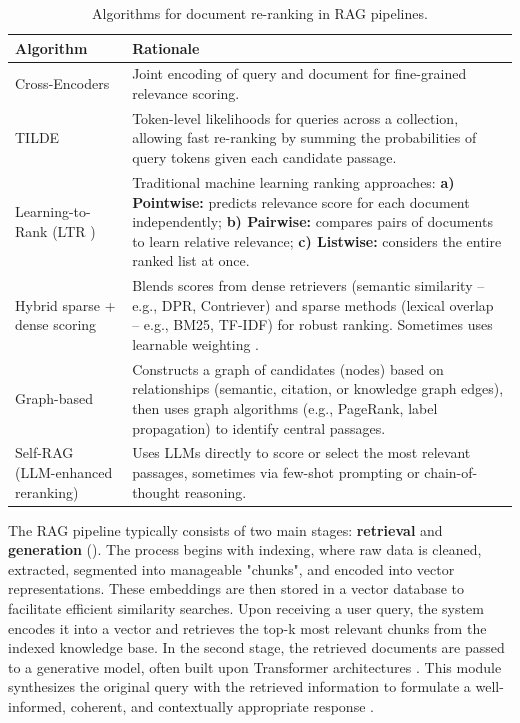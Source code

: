 \begin{spacing}{1.5}
\begin{table}[H]
\centering
\footnotesize
\begin{tabularx}{\textwidth}{l X}
\toprule
\textbf{Algorithm} & \textbf{Rationale} \\
\midrule
Cross-Encoders & Joint encoding of query and document for fine-grained relevance scoring. \\
\cmidrule(lr){1-2}
TILDE \citep{zhuang_tilde_2021} & Token-level likelihoods for queries across a collection, allowing fast re-ranking by summing the probabilities of query tokens given each candidate passage. \\
\cmidrule(lr){1-2}
Learning-to-Rank (LTR \citep{gupta_comprehensive_2024}) & Traditional machine learning ranking approaches: \textbf{a) Pointwise:} predicts relevance score for each document independently; \textbf{b) Pairwise:} compares pairs of documents to learn relative relevance; \textbf{c) Listwise:} considers the entire ranked list at once.\\
\cmidrule(lr){1-2}
Hybrid sparse + dense scoring & Blends scores from dense retrievers (semantic similarity -- e.g., DPR, Contriever) and sparse methods (lexical overlap -- e.g., BM25, TF-IDF) for robust ranking. Sometimes uses learnable weighting \citep{wang_searching_2024}. \\
\cmidrule(lr){1-2}
Graph-based \citep{han_retrieval-augmented_2025} & Constructs a graph of candidates (nodes) based on relationships (semantic, citation, or knowledge graph edges), then uses graph algorithms  (e.g., PageRank, label propagation) to identify central passages. \\
\cmidrule(lr){1-2}
Self-RAG (LLM-enhanced reranking) \citep{asai_self-rag_2023} & Uses LLMs directly to score or select the most relevant passages, sometimes via few-shot prompting or chain-of-thought reasoning. \\
\bottomrule
\end{tabularx}
\vspace{0.5em}
\caption{Algorithms for document re-ranking in RAG pipelines.}
\label{tab:rerank_algorithms}
\end{table}







The RAG pipeline typically consists of two main stages: \textbf{retrieval} and \textbf{generation} (\cite{odsc-community_retrieval-augmented_2024}). The process begins with indexing, where raw data is cleaned, extracted, segmented into manageable "chunks", and encoded into vector representations. These embeddings are then stored in a vector database to facilitate efficient similarity searches. Upon receiving a user query, the system encodes it into a vector and retrieves the top-k most relevant chunks from the indexed knowledge base. In the second stage, the retrieved documents are passed to a generative model, often built upon Transformer architectures \citep{vaswani_attention_2017}. This module synthesizes the original query with the retrieved information to formulate a well-informed, coherent, and contextually appropriate response \citep{arslan_survey_2024}.


\end{spacing}
